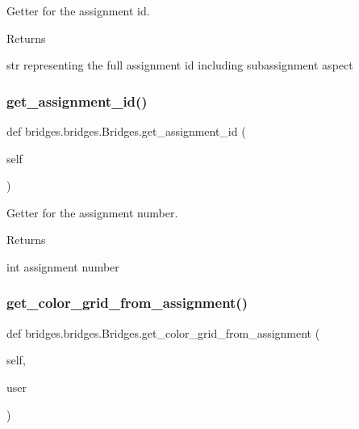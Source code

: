 Getter for the assignment id. 

\begin{DoxyReturn}{Returns}


str representing the full assignment id including subassignment aspect 
\end{DoxyReturn}
\mbox{\label{classbridges_1_1bridges_1_1_bridges_a94f39f11368031ad33800aac0bac2f7d}} 
\subsubsection{\texorpdfstring{get\+\_\+assignment\+\_\+id()}{get\_assignment\_id()}}
{\footnotesize\ttfamily def bridges.\+bridges.\+Bridges.\+get\+\_\+assignment\+\_\+id (\begin{DoxyParamCaption}\item[{}]{self }\end{DoxyParamCaption})}



Getter for the assignment number. 

\begin{DoxyReturn}{Returns}


int assignment number 
\end{DoxyReturn}
\mbox{\label{classbridges_1_1bridges_1_1_bridges_a11c2be346fba56589955894c5f84747d}} 
\subsubsection{\texorpdfstring{get\+\_\+color\+\_\+grid\+\_\+from\+\_\+assignment()}{get\_color\_grid\_from\_assignment()}}
{\footnotesize\ttfamily def bridges.\+bridges.\+Bridges.\+get\+\_\+color\+\_\+grid\+\_\+from\+\_\+assignment (\begin{DoxyParamCaption}\item[{}]{self,  }\item[{}]{user }\end{DoxyParamCaption})}



